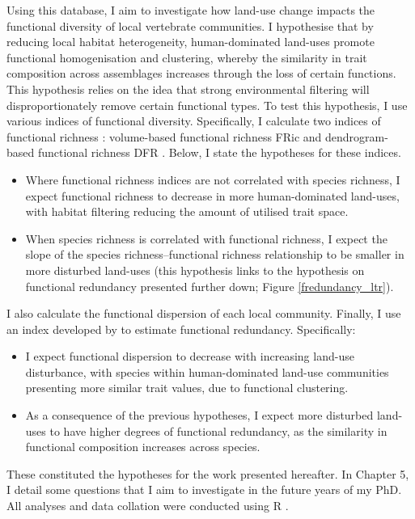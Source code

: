 Using this database, I aim to investigate how land-use change impacts the functional diversity of local vertebrate communities. I hypothesise that by reducing local habitat heterogeneity, human-dominated land-uses promote functional homogenisation and clustering, whereby the similarity in trait composition across assemblages increases through the loss of certain functions. This hypothesis relies on the idea that strong environmental filtering will disproportionately remove certain functional types. To test this hypothesis, I use various indices of functional diversity. Specifically, I calculate two indices of functional richness \citep{Legras2018}: volume-based functional richness FRic \citep{Villeger2008} and dendrogram-based functional richness DFR \citep{Petchey2002}. Below, I state the hypotheses for these indices.
\begin{itemize}
\item Where functional richness indices are not correlated with species richness, I expect functional richness to decrease in more human-dominated land-uses, with habitat filtering reducing the amount of utilised trait space. 
\item When species richness is correlated with functional richness, I expect the slope of the species richness--functional richness relationship to be smaller in more disturbed land-uses (this hypothesis links to the hypothesis on functional redundancy presented further down; Figure \ref{fredundancy_ltr}). 
\end{itemize}

I also calculate the functional dispersion \citep{Laliberte2010} of each local community. Finally, I use an index developed by \citet{Ricotta2016} to estimate functional redundancy. Specifically:
\begin{itemize}
\item I expect functional dispersion to decrease with increasing land-use disturbance, with species within human-dominated land-use communities presenting more similar trait values, due to functional clustering.
\item As a consequence of the previous hypotheses, I expect more disturbed land-uses to have higher degrees of functional redundancy, as the similarity in functional composition increases across species.    
\end{itemize}


\vspace{1cm}
These constituted the hypotheses for the work presented hereafter. In Chapter 5, I detail some questions that I aim to investigate in the future years of my PhD. All analyses and data collation were conducted using R \citep{R_citation}.